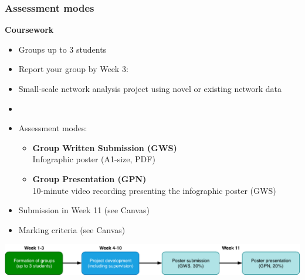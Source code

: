 \documentclass[8pt]{beamer}
\begin{document}

\begin{frame}
\frametitle{Assessment modes}

\textbf{Coursework}\\
\begin{itemize}
\item Groups up to 3 students
\item Report your group by Week 3: \href{https://bit.ly/2KLKCJ6}{}
\item Small-scale network analysis project using novel or existing network data
\item {\color{orange}{Any topic!}}
\item Assessment modes:
	\begin{itemize}
	\item \textbf{Group Written Submission (GWS)} {\color{blue}{[30\% weighting]}}\\
		 Infographic poster (A1-size, PDF)
	\item \textbf{Group Presentation (GPN)} {\color{blue}{[20\% weighting]}}\\
	10-minute video recording presenting the infographic poster (GWS)
	\end{itemize}
\item Submission in Week 11 (see Canvas)
\item Marking criteria (see Canvas)
\end{itemize}

\bigskip

\centering
\includegraphics[width=\linewidth]{flow_chart_group_work}\\

\end{frame}

\end{document}
